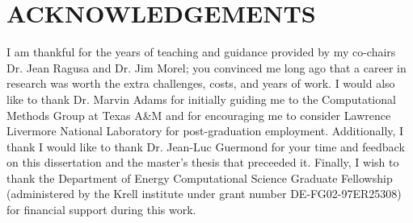 %
%
%


\chapter*{ACKNOWLEDGEMENTS}


\indent I am thankful for the years of teaching and guidance provided by my co-chairs Dr. Jean Ragusa and Dr. Jim Morel; you convinced me long ago that a career in research was worth the extra challenges, costs, and years of work.  I would also like to thank Dr. Marvin Adams for initially guiding me to the Computational Methods Group at Texas A\&M and for encouraging me to consider Lawrence Livermore National Laboratory for post-graduation employment.  
Additionally, I thank I would like to thank Dr. Jean-Luc Guermond for your time and feedback on this dissertation and the master's thesis that preceeded it.
Finally, I wish to thank the Department of Energy Computational Science Graduate Fellowship (administered by the Krell institute under grant number DE-FG02-97ER25308) for financial support during this work.


\pagebreak{}